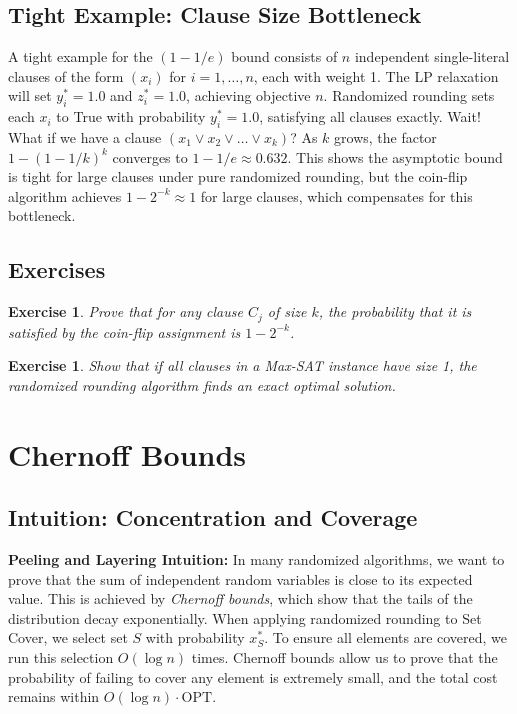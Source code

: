 \documentclass[11pt,oneside]{book}
\newtheorem{exercise}[theorem]{Exercise}
\begin{document}
\section{Tight Example: Clause Size Bottleneck}
A tight example for the $(1-1/e)$ bound consists of $n$ independent single-literal clauses of the form $(x_i)$ for $i=1, \dots, n$, each with weight 1.
The LP relaxation will set $y_i^* = 1.0$ and $z_i^* = 1.0$, achieving objective $n$.
Randomized rounding sets each $x_i$ to True with probability $y_i^* = 1.0$, satisfying all clauses exactly.
Wait! What if we have a clause $(x_1 \lor x_2 \lor \dots \lor x_k)$? As $k$ grows, the factor $1 - (1 - 1/k)^k$ converges to $1 - 1/e \approx 0.632$. This shows the asymptotic bound is tight for large clauses under pure randomized rounding, but the coin-flip algorithm achieves $1 - 2^{-k} \approx 1$ for large clauses, which compensates for this bottleneck.

\section{Exercises}
\begin{exercise}
Prove that for any clause $C_j$ of size $k$, the probability that it is satisfied by the coin-flip assignment is $1 - 2^{-k}$.
\end{exercise}
\begin{exercise}
Show that if all clauses in a Max-SAT instance have size 1, the randomized rounding algorithm finds an exact optimal solution.
\end{exercise}

\setcounter{chapter}{16}
\chapter{Chernoff Bounds}
\label{ch:chernoff_bounds}

\section{Intuition: Concentration and Coverage}

\begin{intuitionbox}
\textbf{Peeling and Layering Intuition:} In many randomized algorithms, we want to prove that the sum of independent random variables is close to its expected value. This is achieved by \emph{Chernoff bounds}, which show that the tails of the distribution decay exponentially. When applying randomized rounding to Set Cover, we select set $S$ with probability $x_S^*$. To ensure all elements are covered, we run this selection $O(\log n)$ times. Chernoff bounds allow us to prove that the probability of failing to cover any element is extremely small, and the total cost remains within $O(\log n) \cdot \text{OPT}$.
\end{intuitionbox}
\end{document}
